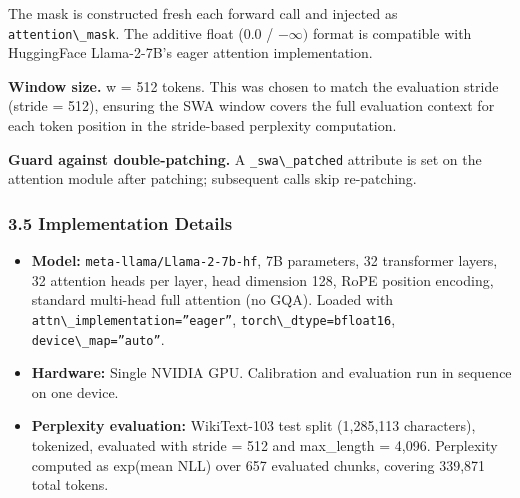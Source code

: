 The mask is constructed fresh each forward call and injected as \texttt{attention\textbackslash \_mask}. The additive float (0.0 / $-\infty )$ format is compatible with HuggingFace Llama-2-7B's eager attention implementation.

\textbf{Window size.} w = 512 tokens. This was chosen to match the evaluation stride (stride = 512), ensuring the SWA window covers the full evaluation context for each token position in the stride-based perplexity computation.

\textbf{Guard against double-patching.} A \texttt{\_swa\textbackslash \_patched} attribute is set on the attention module after patching; subsequent calls skip re-patching.

\subsubsection{3.5 Implementation Details}

\begin{itemize}
\item \textbf{Model:} \texttt{meta-llama/Llama-2-7b-hf}, 7B parameters, 32 transformer layers, 32 attention heads per layer, head dimension 128, RoPE position encoding, standard multi-head full attention (no GQA). Loaded with \texttt{attn\textbackslash \_implementation=''eager''}, \texttt{torch\textbackslash \_dtype=bfloat16}, \texttt{device\textbackslash \_map=''auto''}.
\item \textbf{Hardware:} Single NVIDIA GPU. Calibration and evaluation run in sequence on one device.
\item \textbf{Perplexity evaluation:} WikiText-103 test split (1,285,113 characters), tokenized, evaluated with stride = 512 and max\_length = 4,096. Perplexity computed as exp(mean NLL) over 657 evaluated chunks, covering 339,871 total tokens.
\end{itemize}

